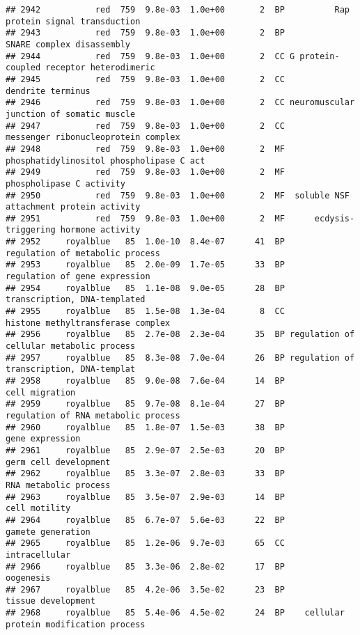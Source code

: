 \documentclass[]{article}
\begin{document}
\begin{verbatim}
## 2942           red  759  9.8e-03  1.0e+00       2  BP          Rap protein signal transduction
## 2943           red  759  9.8e-03  1.0e+00       2  BP                SNARE complex disassembly
## 2944           red  759  9.8e-03  1.0e+00       2  CC G protein-coupled receptor heterodimeric
## 2945           red  759  9.8e-03  1.0e+00       2  CC                        dendrite terminus
## 2946           red  759  9.8e-03  1.0e+00       2  CC neuromuscular junction of somatic muscle
## 2947           red  759  9.8e-03  1.0e+00       2  CC      messenger ribonucleoprotein complex
## 2948           red  759  9.8e-03  1.0e+00       2  MF phosphatidylinositol phospholipase C act
## 2949           red  759  9.8e-03  1.0e+00       2  MF                 phospholipase C activity
## 2950           red  759  9.8e-03  1.0e+00       2  MF  soluble NSF attachment protein activity
## 2951           red  759  9.8e-03  1.0e+00       2  MF      ecdysis-triggering hormone activity
## 2952     royalblue   85  1.0e-10  8.4e-07      41  BP          regulation of metabolic process
## 2953     royalblue   85  2.0e-09  1.7e-05      33  BP            regulation of gene expression
## 2954     royalblue   85  1.1e-08  9.0e-05      28  BP             transcription, DNA-templated
## 2955     royalblue   85  1.5e-08  1.3e-04       8  CC        histone methyltransferase complex
## 2956     royalblue   85  2.7e-08  2.3e-04      35  BP regulation of cellular metabolic process
## 2957     royalblue   85  8.3e-08  7.0e-04      26  BP regulation of transcription, DNA-templat
## 2958     royalblue   85  9.0e-08  7.6e-04      14  BP                           cell migration
## 2959     royalblue   85  9.7e-08  8.1e-04      27  BP      regulation of RNA metabolic process
## 2960     royalblue   85  1.8e-07  1.5e-03      38  BP                          gene expression
## 2961     royalblue   85  2.9e-07  2.5e-03      20  BP                    germ cell development
## 2962     royalblue   85  3.3e-07  2.8e-03      33  BP                    RNA metabolic process
## 2963     royalblue   85  3.5e-07  2.9e-03      14  BP                            cell motility
## 2964     royalblue   85  6.7e-07  5.6e-03      22  BP                        gamete generation
## 2965     royalblue   85  1.2e-06  9.7e-03      65  CC                            intracellular
## 2966     royalblue   85  3.3e-06  2.8e-02      17  BP                                oogenesis
## 2967     royalblue   85  4.2e-06  3.5e-02      23  BP                       tissue development
## 2968     royalblue   85  5.4e-06  4.5e-02      24  BP    cellular protein modification process

\end{verbatim}
\end{document}
